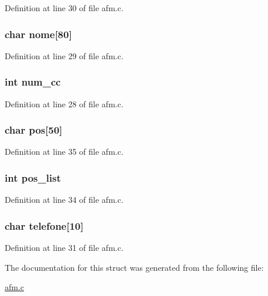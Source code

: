 \-Definition at line 30 of file afm.\-c.

\hypertarget{structjogador_a2fe8d29936547b4ede632f419ea32367}{
\subsubsection[{nome}]{\setlength{\rightskip}{0pt plus 5cm}char {\bf nome}\mbox{[}80\mbox{]}}}\label{structjogador_a2fe8d29936547b4ede632f419ea32367}


\-Definition at line 29 of file afm.\-c.

\hypertarget{structjogador_a561e04bb7721ed7305217ca1d72f1ed8}{
\subsubsection[{num\-\_\-cc}]{\setlength{\rightskip}{0pt plus 5cm}int {\bf num\-\_\-cc}}}\label{structjogador_a561e04bb7721ed7305217ca1d72f1ed8}


\-Definition at line 28 of file afm.\-c.

\hypertarget{structjogador_a7e6f061ca28cd2d7f3080f7944feebcd}{
\subsubsection[{pos}]{\setlength{\rightskip}{0pt plus 5cm}char {\bf pos}\mbox{[}50\mbox{]}}}\label{structjogador_a7e6f061ca28cd2d7f3080f7944feebcd}


\-Definition at line 35 of file afm.\-c.

\hypertarget{structjogador_a4cf0debbda53bf46c4417eecce803e04}{
\subsubsection[{pos\-\_\-list}]{\setlength{\rightskip}{0pt plus 5cm}int {\bf pos\-\_\-list}}}\label{structjogador_a4cf0debbda53bf46c4417eecce803e04}


\-Definition at line 34 of file afm.\-c.

\hypertarget{structjogador_a2b3e6e14a2f6909a2d7c095c16a343c8}{
\subsubsection[{telefone}]{\setlength{\rightskip}{0pt plus 5cm}char {\bf telefone}\mbox{[}10\mbox{]}}}\label{structjogador_a2b3e6e14a2f6909a2d7c095c16a343c8}


\-Definition at line 31 of file afm.\-c.



\-The documentation for this struct was generated from the following file\-:\begin{DoxyCompactItemize}
\item 
\hyperlink{afm_8c}{afm.\-c}\end{DoxyCompactItemize}
